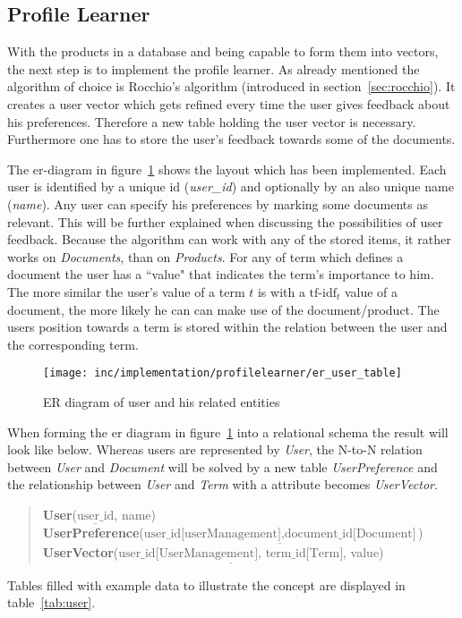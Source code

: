 
\subsection{Profile Learner}
\label{sec:rocchio-impl}
With the products in a database and being capable to form them into vectors, the next step is to implement the profile learner.
As already mentioned the algorithm of choice is Rocchio's algorithm (introduced in section~\ref{sec:rocchio}).
It creates a user vector which gets refined every time the user gives feedback about his preferences.
Therefore a new table holding the user vector is necessary.
Furthermore one has to store the user's feedback towards some of the documents.

The er-diagram in figure~\ref{fig:er_user_table} shows the layout which has been implemented.
Each user is identified by a unique id (\textit{user\_id}) and optionally by an also unique name (\textit{name}).
Any user can specify his preferences by marking some documents as relevant.
This will be further explained when discussing the possibilities of user feedback.
Because the algorithm can work with any of the stored items, it rather works on \textit{Documents}, than on \textit{Products}.
For any of term which defines a document the user has a ``value" that indicates the term's importance to him.
The more similar the user's value of a term $t$ is with a $\text{tf-idf}_t$ value of a document, the more likely he can can make use of the document/product.
The users position towards a term is stored within the relation between the user and the corresponding term.

\begin{figure}[h]
    \center
    \texttt{[image: inc/implementation/profilelearner/er\_user\_table]}
    \caption{ER diagram of user and his related entities}
    \label{fig:er_user_table}
\end{figure}

When forming the er diagram in figure~\ref{fig:er_user_table} into a relational schema the result will look like below.
Whereas users are represented by \textit{User}, the N-to-N relation between \textit{User} and \textit{Document} will be solved by a new table \textit{UserPreference} and the relationship between \textit{User} and \textit{Term} with a attribute becomes \textit{UserVector}.
\begin{quote}
    \textbf{User}($\underline{\text{user\_id}}$, name)\\
    \textbf{UserPreference}($\underline{\text{user\_id[userManagement]},\text{document\_id[Document]}}$)\\
    \textbf{UserVector}($\underline{\text{user\_id[UserManagement], term\_id[Term]}}$, value)\\
\end{quote}
Tables filled with example data to illustrate the concept are displayed in table~\ref{tab:user}.


